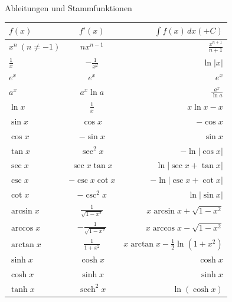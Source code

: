 \begin{minipage}{\linewidth}
\Tab Ableitungen und Stammfunktionen

\begin{tabular}{l c r}
    $f(x)$ & $f'(x)$ & $\int f(x) \, dx (+ C)$ \\
    \hline
    $x^n \ (n \neq -1)$ & $n x^{n-1}$ & $\frac{x^{n+1}}{n+1}$ \\[1ex]
    $\frac{1}{x}$ & $-\frac{1}{x^2}$ & $\ln|x|$ \\[1ex]
    $e^x$ & $e^x$ & $e^x$ \\[1ex]
    $a^x$ & $a^x \ln a$ & $\frac{a^x}{\ln a}$ \\[1ex]
    $\ln x$ & $\frac{1}{x}$ & $x \ln x - x$ \\[0.5ex]
    \hline
    $\sin x$ & $\cos x$ & $-\cos x$ \\[1ex]
    $\cos x$ & $-\sin x$ & $\sin x$ \\[1ex]
    $\tan x$ & $\sec^2 x$ & $-\ln|\cos x|$ \\[1ex]
    $\sec x$ & $\sec x \tan x$ & $\ln|\sec x + \tan x|$ \\[1ex]
    $\csc x$ & $-\csc x \cot x$ & $-\ln|\csc x + \cot x|$ \\[1ex]
    $\cot x$ & $-\csc^2 x$ & $\ln|\sin x|$ \\
    \hline
    $\arcsin x$ & $\frac{1}{\sqrt{1-x^2}}$ & $x \arcsin x + \sqrt{1-x^2}$ \\[1ex]
    $\arccos x$ & $-\frac{1}{\sqrt{1-x^2}}$ & $x \arccos x - \sqrt{1-x^2}$ \\[1ex]
    $\arctan x$ & $\frac{1}{1+x^2}$ & $x \arctan x - \frac{1}{2}\ln(1+x^2)$ \\[0.5ex]
    \hline
    $\sinh x$ & $\cosh x$ & $\cosh x$ \\[1ex]
    $\cosh x$ & $\sinh x$ & $\sinh x$ \\[1ex]
    $\tanh x$ & $\operatorname{sech}^2 x$ & $\ln(\cosh x)$ \\
\end{tabular}
\end{minipage}

